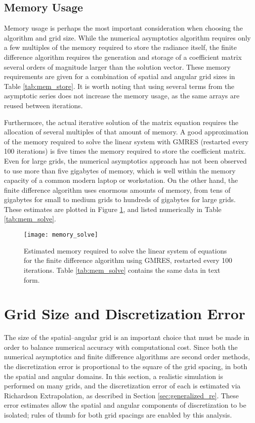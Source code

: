\subsection{Memory Usage}
Memory usage is perhaps the most important consideration when choosing the algorithm and grid size.
While the numerical asymptotics algorithm requires only a few multiples of the memory required to store the radiance itself, the finite difference algorithm requires the generation and storage of a coefficient matrix several orders of magnitude larger than the solution vector.
These memory requirements are given for a combination of spatial and angular grid sizes in Table \ref{tab:mem_store}.
It is worth noting that using several terms from the asymptotic series does not increase the memory usage, as the same arrays are reused between iterations.

Furthermore, the actual iterative solution of the matrix equation requires the allocation of several multiples of that amount of memory.
A good approximation of the memory required to solve the linear system with GMRES (restarted every 100 iterations) is five times the memory required to store the coefficient matrix.
Even for large grids, the numerical asymptotics approach has not been observed to use more than five gigabytes of memory, which is well within the memory capacity of a common modern laptop or workstation.
On the other hand, the finite difference algorithm uses enormous amounts of memory, from tens of gigabytes for small to medium grids to hundreds of gigabytes for large grids.
These estimates are plotted in Figure \ref{fig:mem_solve}, and listed numerically in Table \ref{tab:mem_solve}.
\begin{figure}[H]
  \centering
  \texttt{[image: memory\_solve]}
  \caption{Estimated memory required to solve the linear system of equations for the finite difference algorithm using GMRES, restarted every 100 iterations. Table \ref{tab:mem_solve} contains the same data in text form.}
  \label{fig:mem_solve}
\end{figure}

\section{Grid Size and Discretization Error}
\label{sec:grid_size}
The size of the spatial--angular grid is an important choice that must be made in order to balance numerical accuracy with computational cost.
Since both the numerical asymptotics and finite difference algorithms are second order methods, the discretization error is proportional to the square of the grid spacing, in both the spatial and angular domains.
In this section, a realistic simulation is performed on many grids, and the discretization error of each is estimated via Richardson Extrapolation, as described in Section \ref{sec:generalized_re}.
These error estimates allow the spatial and angular components of discretization to be isolated; rules of thumb for both grid spacings are enabled by this analysis.

